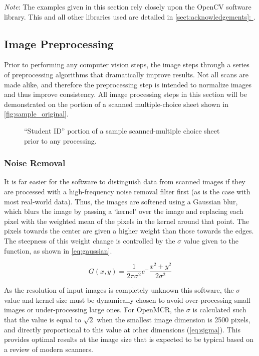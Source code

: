 \documentclass[12pt, letterpaper]{report}
\newcommand*{\sectref}[1]{\hyperref[{#1}]{\ref*{#1}: \nameref*{#1}}}
\newcommand*{\itemref}[1]{\hyperref[{#1}]{\autoref*{#1}}}
\newcommand*{\boxedimage}[1]{\fbox{\texttt{[image: img/\#1]}}}
\newcommand{\fig}[3]{
  \begin{figure}[!htbp]
    \caption{#1}
    \label{#3}
    \centering
    \boxedimage{#2}
  \end{figure}
}
\newcommand{\eq}[3]{
  \begin{eqn}[!htbp]
    #2
    \caption{#1}
    \label{#3}
  \end{eqn}
}
\begin{document}
\textit{Note}: The examples given in this section rely closely upon the OpenCV
software library. This and all other libraries used are detailed in
\sectref{sect:acknowledgements}. 

\subsection{Image Preprocessing}
Prior to performing any computer vision steps, the image steps through a series
of preprocessing algorithms that dramatically improve results. Not all scans
are made alike, and therefore the preprocessing step is intended to normalize
images and thus improve consistency. All image processing steps in this section
will be demonstrated on the portion of a scanned multiple-choice sheet shown in
\itemref{fig:sample_original}.

\fig{``Student ID'' portion of a sample scanned-multiple choice sheet prior to any processing.}{sample/original.jpg}{fig:sample_original}

\subsubsection{Noise Removal}
It is far easier for the software to distinguish data from scanned images if
they are processed with a high-frequency noise removal filter first (as is the
case with most real-world data). Thus, the images are softened using a Gaussian
blur, which blurs the image by passing a `kernel' over the image and
replacing each pixel with the weighted mean of the pixels in the kernel around
that point. The pixels towards the center are given a higher weight than those
towards the edges. The steepness of this weight change is controlled by the
$\sigma$ value given to the function, as shown in \itemref{eq:gaussian}.

\eq{2D Gaussian distribution function, where $x$ and $y$ are $0$ at the center of the kernel.}{\[ G(x,y)=\frac{1}{2\pi\sigma^2}e^-\frac{x^2+y^2}{2\sigma^2} \]}{eq:gaussian}

As the resolution of input images is completely unknown this software, the $\sigma$
value and kernel size must be dynamically chosen to avoid over-processing small images or
under-processing large ones. For OpenMCR, the $\sigma$ is calculated such that
the value is equal to $\sqrt{2}$ when the smallest image dimension is 2500
pixels, and directly proportional to this value at other dimensions (\itemref{eq:sigma}). This
provides optimal results at the image size that is expected to be
typical based on a review of modern scanners.
\end{document}
